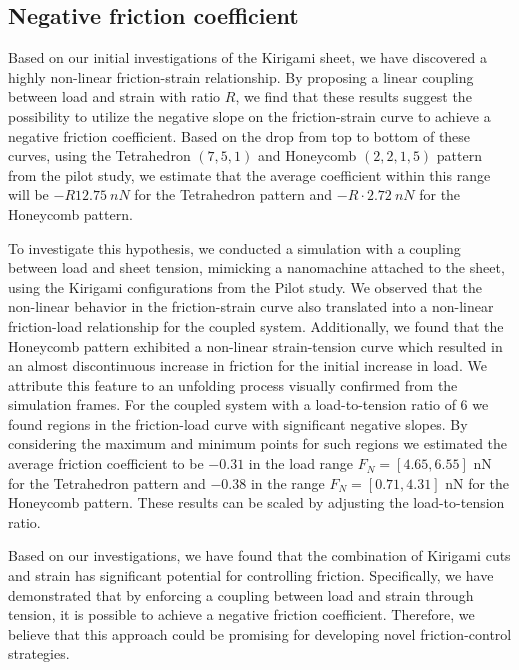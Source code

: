 \subsection{Negative friction coefficient}
Based on our initial investigations of the Kirigami sheet, we have discovered a
highly non-linear friction-strain relationship. By proposing a linear coupling
between load and strain with ratio $R$, we find that these results suggest the
possibility to utilize the negative slope on the friction-strain curve to
achieve a negative friction coefficient. Based on the drop from top to bottom of
these curves, using the Tetrahedron $(7,5,1)$ and Honeycomb $(2,2,1,5)$ pattern
from the pilot study, we estimate that the average coefficient within this range
will be $-R\SI{12.75}{nN}$ for the Tetrahedron pattern and
$-R\cdot\SI{2.72}{nN}$  for the Honeycomb pattern.

To investigate this hypothesis, we conducted a simulation with a coupling
between load and sheet tension, mimicking a nanomachine attached to the sheet,
using the Kirigami configurations from the Pilot study. We observed that the non-linear behavior in the friction-strain curve also translated into a non-linear friction-load relationship for the coupled system. Additionally, we found that the Honeycomb pattern exhibited a non-linear strain-tension curve which resulted in an almost discontinuous increase in friction for the initial
increase in load. We attribute this feature to an unfolding process visually
confirmed from the simulation frames. For the coupled system with a
load-to-tension ratio of 6 we found regions in the friction-load curve with
significant negative slopes. By considering the maximum and minimum points for
such regions we estimated the average friction coefficient to be $-0.31$ in the
load range $F_N = [4.65, 6.55]$ nN for the Tetrahedron pattern and $-0.38$ in the
range $F_N = [0.71, 4.31]$ nN for the Honeycomb pattern. These results can be scaled by adjusting the load-to-tension ratio.

Based on our investigations, we have found that the combination of Kirigami cuts and strain has significant potential for controlling friction. Specifically, we have demonstrated that by enforcing a coupling between load and strain through tension, it is possible to achieve a negative friction coefficient. Therefore, we believe that this approach could be promising for developing novel friction-control strategies.




